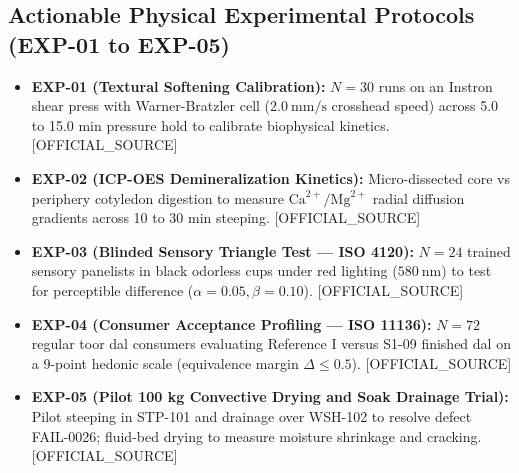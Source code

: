 \documentclass[10pt,a4paper]{article}
\newcommand{\epistag}[1]{\textsf{\scriptsize\textcolor{fnqslate}{[#1]}}}
\begin{document}
\subsection{Actionable Physical Experimental Protocols (EXP-01 to EXP-05)}
\begin{itemize}
    \item \textbf{EXP-01 (Textural Softening Calibration):} $N=30$ runs on an Instron shear press with Warner-Bratzler cell ($2.0\ \mathrm{mm/s}$ crosshead speed) across 5.0 to 15.0 min pressure hold to calibrate biophysical kinetics. \epistag{OFFICIAL\_SOURCE}
    \item \textbf{EXP-02 (ICP-OES Demineralization Kinetics):} Micro-dissected core vs periphery cotyledon digestion to measure $\mathrm{Ca}^{2+}/\mathrm{Mg}^{2+}$ radial diffusion gradients across 10 to 30 min steeping. \epistag{OFFICIAL\_SOURCE}
    \item \textbf{EXP-03 (Blinded Sensory Triangle Test --- ISO 4120):} $N=24$ trained sensory panelists in black odorless cups under red lighting ($580\ \mathrm{nm}$) to test for perceptible difference ($\alpha=0.05, \beta=0.10$). \epistag{OFFICIAL\_SOURCE}
    \item \textbf{EXP-04 (Consumer Acceptance Profiling --- ISO 11136):} $N=72$ regular toor dal consumers evaluating Reference I versus S1-09 finished dal on a 9-point hedonic scale (equivalence margin $\Delta \le 0.5$). \epistag{OFFICIAL\_SOURCE}
    \item \textbf{EXP-05 (Pilot 100 kg Convective Drying and Soak Drainage Trial):} Pilot steeping in STP-101 and drainage over WSH-102 to resolve defect FAIL-0026; fluid-bed drying to measure moisture shrinkage and cracking. \epistag{OFFICIAL\_SOURCE}
\end{itemize}
\end{document}
